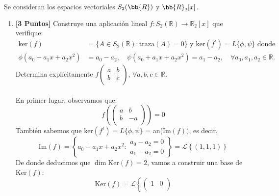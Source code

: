 \documentclass[12pt]{article}
\begin{document}
\begin{ejercicio}[5,5 puntos]
	Se consideran los espacios vectoriales $S_2(\bb{R})$ y $\bb{R}_2[x]$.
	\begin{enumerate}
		\item \textbf{[3 Puntos]} Construye una aplicación lineal \( f : S_2(\mathbb{R}) \rightarrow \mathbb{R}_2[x] \) que verifique:
		      \begin{equation*}
			      \begin{aligned}
				      \text{ker}(f)             & = \{ A \in S_2(\mathbb{R}) : \text{traza}(A) = 0 \} \text{ y ker}(f^t) = L\{ \phi, \psi \} \text{ donde} \\
				      \phi(a_0 + a_1x + a_2x^2) & = a_0 - a_2, \quad \psi(a_0 + a_1x + a_2x^2) = a_1 - a_2, \quad \forall a_0, a_1, a_2 \in \mathbb{R}.
			      \end{aligned}
		      \end{equation*}
		      Determina explícitamente \( f \begin{pmatrix}
			      a & b \\
			      b & c \\
		      \end{pmatrix} \), \(\forall a, b, c \in \mathbb{R} \). \\ \\
		      En primer lugar, observamos que:
		      \begin{equation*}
			      f\left(\begin{pmatrix}
				      a & b  \\
				      b & -a \\
			      \end{pmatrix}\right) = 0
		      \end{equation*}
		      También sabemos que ker$(f^t) = L\{ \phi, \psi \}$ = an(Im$(f))$, es decir,
		      \begin{equation*}
			      \text{Im}(f) = \left\{ a_0 + a_1x + a_2x^2 : \begin{array}{l}
				      a_0 - a_2 = 0 \\
				      a_1 - a_2 = 0
			      \end{array} \right\} = \mathcal{L}\left\{ (1,1,1)\right\}
		      \end{equation*}
		      De donde deducimos que $\dim\text{Ker}(f) = 2$, vamos a construir una base de Ker$(f)$:
		      \begin{equation*}
			      \text{Ker}(f) = \mathcal{L}\left\{\begin{pmatrix}
				      1 & 0  \\

\end{pmatrix}
\end{equation*}
\end{enumerate}
\end{ejercicio}
\end{document}
